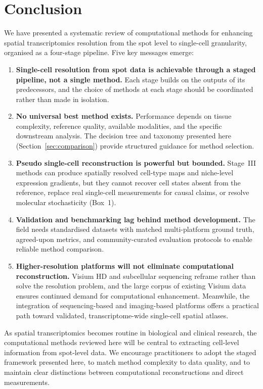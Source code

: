 \section{Conclusion}
\label{sec:conclusion}

We have presented a systematic review of computational methods for enhancing spatial transcriptomics resolution from the spot level to single-cell granularity, organised as a four-stage pipeline. Five key messages emerge:

\begin{enumerate}
  \item \textbf{Single-cell resolution from spot data is achievable through a staged pipeline, not a single method.} Each stage builds on the outputs of its predecessors, and the choice of methods at each stage should be coordinated rather than made in isolation.

  \item \textbf{No universal best method exists.} Performance depends on tissue complexity, reference quality, available modalities, and the specific downstream analysis. The decision tree and taxonomy presented here (Section~\ref{sec:comparison}) provide structured guidance for method selection.

  \item \textbf{Pseudo single-cell reconstruction is powerful but bounded.} Stage~III methods can produce spatially resolved cell-type maps and niche-level expression gradients, but they cannot recover cell states absent from the reference, replace real single-cell measurements for causal claims, or resolve molecular stochasticity (Box~1).

  \item \textbf{Validation and benchmarking lag behind method development.} The field needs standardised datasets with matched multi-platform ground truth, agreed-upon metrics, and community-curated evaluation protocols to enable reliable method comparison.

  \item \textbf{Higher-resolution platforms will not eliminate computational reconstruction.} Visium HD and subcellular sequencing reframe rather than solve the resolution problem, and the large corpus of existing Visium data ensures continued demand for computational enhancement. Meanwhile, the integration of sequencing-based and imaging-based platforms offers a practical path toward validated, transcriptome-wide single-cell spatial atlases.
\end{enumerate}

As spatial transcriptomics becomes routine in biological and clinical research, the computational methods reviewed here will be central to extracting cell-level information from spot-level data. We encourage practitioners to adopt the staged framework presented here, to match method complexity to data quality, and to maintain clear distinctions between computational reconstructions and direct measurements.
